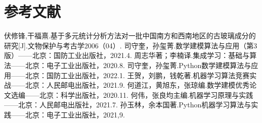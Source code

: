 \section{参考文献}


\renewcommand{\refname}{}
\vspace{-3em}  


\begin{thebibliography}{50}  
	伏修锋,干福熹.基于多元统计分析方法对一批中国南方和西南地区的古玻璃成分的研究[J].文物保护与考古学2006（04）.
	司守奎，孙玺菁.数学建模算法与应用（第3版）——北京：国防工业出版社，2021.4.
	周志华著；李楠译.集成学习：基础与算法——北京：电子工业出版社，2020.8. 
	司守奎，孙玺菁.Python数学建模算法与应用——北京：国防工业出版社，2022.1.
	王贺，刘鹏，钱乾著.机器学习算法竞赛实战——北京：人民邮电出版社，2021.9.
	何道江，黄旭东，张琼编.数学建模优秀论文选编——北京：科学出版社，2020.11.
	何伟，张良均主编.机器学习原理与实践——北京：人民邮电出版社，2021.7.
	孙玉林，余本国著.Python机器学习算法与实践——北京：电子工业出版社，2021,9.
\end{thebibliography} 